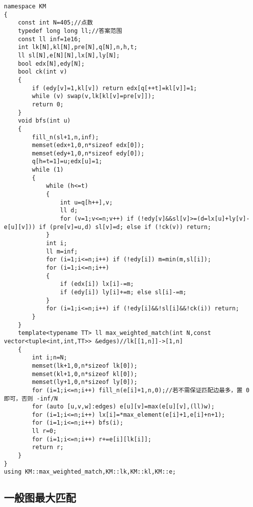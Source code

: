 \documentclass[12pt]{ctexart}
\begin{document}
\begin{lstlisting}
namespace KM
{
	const int N=405;//点数
	typedef long long ll;//答案范围
	const ll inf=1e16;
	int lk[N],kl[N],pre[N],q[N],n,h,t;
	ll sl[N],e[N][N],lx[N],ly[N];
	bool edx[N],edy[N];
	bool ck(int v)
	{
		if (edy[v]=1,kl[v]) return edx[q[++t]=kl[v]]=1;
		while (v) swap(v,lk[kl[v]=pre[v]]);
		return 0;
	}
	void bfs(int u)
	{
		fill_n(sl+1,n,inf);
		memset(edx+1,0,n*sizeof edx[0]);
		memset(edy+1,0,n*sizeof edy[0]);
		q[h=t=1]=u;edx[u]=1;
		while (1)
		{
			while (h<=t)
			{
				int u=q[h++],v;
				ll d;
				for (v=1;v<=n;v++) if (!edy[v]&&sl[v]>=(d=lx[u]+ly[v]-e[u][v])) if (pre[v]=u,d) sl[v]=d; else if (!ck(v)) return;
			}
			int i;
			ll m=inf;
			for (i=1;i<=n;i++) if (!edy[i]) m=min(m,sl[i]);
			for (i=1;i<=n;i++)
			{
				if (edx[i]) lx[i]-=m;
				if (edy[i]) ly[i]+=m; else sl[i]-=m;
			}
			for (i=1;i<=n;i++) if (!edy[i]&&!sl[i]&&!ck(i)) return;
		}
	}
	template<typename TT> ll max_weighted_match(int N,const vector<tuple<int,int,TT>> &edges)//lk[[1,n]]->[1,n]
	{
		int i;n=N;
		memset(lk+1,0,n*sizeof lk[0]);
		memset(kl+1,0,n*sizeof kl[0]);
		memset(ly+1,0,n*sizeof ly[0]);
		for (i=1;i<=n;i++) fill_n(e[i]+1,n,0);//若不需保证匹配边最多，置 0 即可，否则 -inf/N
		for (auto [u,v,w]:edges) e[u][v]=max(e[u][v],(ll)w);
		for (i=1;i<=n;i++) lx[i]=*max_element(e[i]+1,e[i]+n+1);
		for (i=1;i<=n;i++) bfs(i);
		ll r=0;
		for (i=1;i<=n;i++) r+=e[i][lk[i]];
		return r;
	}
}
using KM::max_weighted_match,KM::lk,KM::kl,KM::e;
\end{lstlisting}

\subsection{一般图最大匹配}
\end{document}
